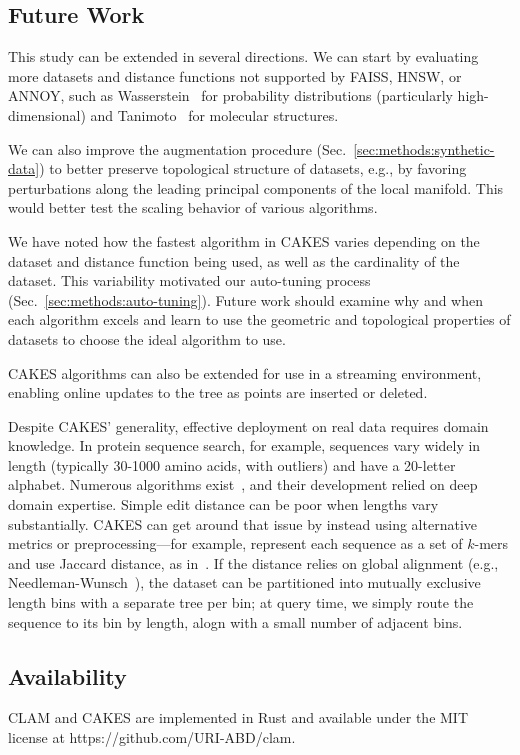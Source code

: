 \subsection{Future Work}

This study can be extended in several directions.
We can start by evaluating more datasets and distance functions not supported by FAISS, HNSW, or ANNOY, such as Wasserstein~\cite{vallender1974calculation} for probability distributions (particularly high-dimensional) and Tanimoto~\cite{bajusz2015tanimoto} for molecular structures.

We can also improve the augmentation procedure (Sec.~\ref{sec:methods:synthetic-data}) to better preserve topological structure of datasets, e.g., by favoring perturbations along the leading principal components of the local manifold.
This would better test the scaling behavior of various algorithms.

We have noted how the fastest algorithm in CAKES varies depending on the dataset and distance function being used, as well as the cardinality of the dataset.
This variability motivated our auto-tuning process (Sec.~\ref{sec:methods:auto-tuning}).
Future work should examine why and when each algorithm excels and learn to use the geometric and topological properties of datasets to choose the ideal algorithm to use.

CAKES algorithms can also be extended for use in a streaming environment, enabling online updates to the tree as points are inserted or deleted.

Despite CAKES' generality, effective deployment on real data requires domain knowledge.
In protein sequence search, for example, sequences vary widely in length (typically 30-1000 amino acids, with outliers) and have a 20-letter alphabet.
Numerous algorithms exist~\cite{kim2021entrance, daniels2013compressive, yu2015entropy, steinegger2018clustering}, and their development relied on deep domain expertise.
Simple edit distance can be poor when lengths vary substantially.
CAKES can get around that issue by instead using alternative metrics or preprocessing—for example, represent each sequence as a set of $k$-mers and use Jaccard distance, as in~\cite{kim2021entrance}.
If the distance relies on global alignment (e.g., Needleman-Wunsch~\cite{needleman1970general}), the dataset can be partitioned into mutually exclusive length bins with a separate tree per bin;
at query time, we simply route the sequence to its bin by length, alogn with a small number of adjacent bins.

\subsection{Availability}

CLAM and CAKES are implemented in Rust and available under the MIT license at https://github.com/URI-ABD/clam.
